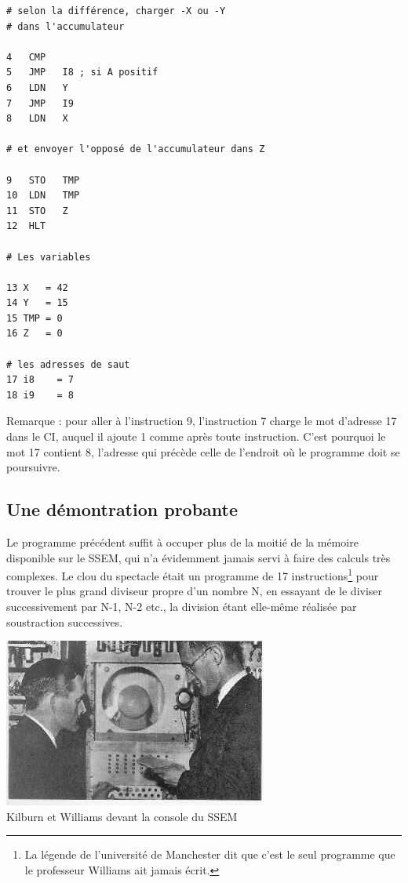 \begin{multicols}{2}
\begin{verbatim}
# selon la différence, charger -X ou -Y 
# dans l'accumulateur

4   CMP  
5   JMP   I8 ; si A positif
6   LDN   Y
7   JMP   I9
8   LDN   X

# et envoyer l'opposé de l'accumulateur dans Z

9   STO   TMP
10  LDN   TMP
11  STO   Z
12  HLT

# Les variables

13 X   = 42
14 Y   = 15 
15 TMP = 0
16 Z   = 0

# les adresses de saut
17 i8    = 7 
18 i9    = 8
\end{verbatim}

Remarque : pour aller à l'instruction 9, l'instruction 7 charge le mot
d'adresse 17 dans le CI, auquel il ajoute 1 comme après toute
instruction.  C'est pourquoi le mot 17 contient 8, l'adresse qui
précède celle de l'endroit où le programme doit se poursuivre.



\subsection{Une démontration probante}

Le programme précédent suffit à occuper plus de la moitié de la
mémoire disponible sur le SSEM, qui n'a évidemment jamais servi à
faire des calculs très complexes. Le clou du spectacle était un
programme de 17 instructions\footnote{La légende de l'université de
  Manchester dit que c'est le seul programme que le professeur
  Williams ait jamais écrit.}  pour trouver le plus grand diviseur
propre d'un nombre N, en essayant de le diviser successivement par
N-1, N-2 etc., la division étant elle-même réalisée par soustraction
successives.

\begin{center}
\includegraphics[width=0.9\linewidth]{Historique/hist409t.jpg}
\\
Kilburn et Williams devant la console du SSEM
\end{center}


\end{multicols}
